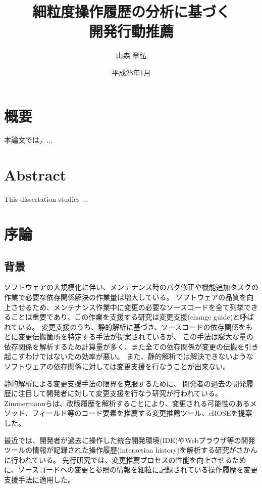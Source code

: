 \documentclass[a4paper]{jsbook}
\title{細粒度操作履歴の分析に基づく\\開発行動推薦}
\author{山森 章弘}
\date{平成28年1月}
\affiliation{大学院情報理工学研究科 計算工学専攻}
\begin{document}
\frontmatter
\maketitle

\chapter*{概要}
本論文では，...

\chapter*{Abstract}
This dissertation studies ...

\tableofcontents
\listoffigures
\listoftables

\mainmatter

\chapter{序論}
\section{背景}
ソフトウェアの大規模化に伴い、メンテナンス時のバグ修正や機能追加タスクの作業で必要な依存関係解決の作業量は増大している。
ソフトウェアの品質を向上させるため、メンテナンス作業中に変更の必要なソースコードを全て列挙できることは重要であり、この作業を支援する研究は変更支援(change guide)と呼ばれている。
変更支援のうち、静的解析に基づき、ソースコードの依存関係をもとに変更伝搬箇所を特定する手法が提案されている\cite{792645}が、
この手法は膨大な量の依存関係を解析するため計算量が多く、また全ての依存関係が変更の伝搬を引き起こすわけではないため効率が悪い\cite{Geipel:2009}。
また、静的解析では解決できないようなソフトウェアの依存関係に対しては変更支援を行なうことが出来ない\cite{5609732}。

静的解析による変更支援手法の限界を克服するために、
開発者の過去の開発履歴に注目して開発者に対して変更支援を行なう研究が行われている\cite{738508, Kagdi:2006}。
Zimmermannらは、改版履歴を解析することにより、変更される可能性のあるメソッド、フィールド等のコード要素を推薦する変更推薦ツール、eROSE\cite{Zimmermann:2005}を提案した。

最近では、開発者が過去に操作した統合開発環境(IDE)やWebブラウザ等の開発ツールの情報が記録された操作履歴(interaction history)\cite{rsse:2014}を解析する研究がさかんに行われている。
先行研究\cite{6233415,KatoJapanese:2011,ss2012-76,ss2013-84,Yamamori:2016}では、変更推薦プロセスの性能を向上させるために、ソースコードへの変更と参照の情報を細粒に記録されている操作履歴を変更支援手法に適用した。
\end{document}
